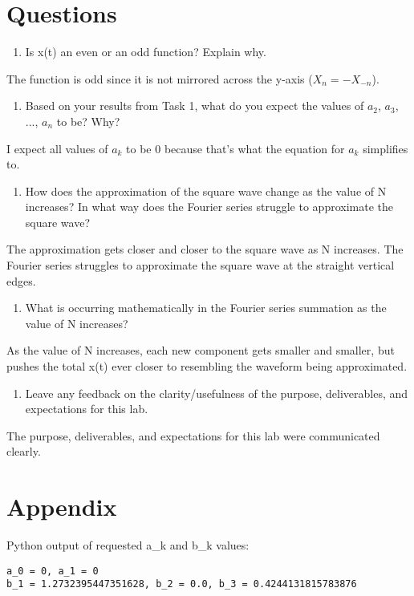 \documentclass[12pt]{article}
\begin{document}
\newpage
\section*{Questions}

\begin{enumerate}
    \item Is x(t) an even or an odd function? Explain why.
\end{enumerate}
    \par The function is odd since it is not mirrored across the y-axis ($X_n = -X_{-n}$).
    
\begin{enumerate}[resume]
    \item Based on your results from Task 1, what do you expect the values of $a_2$, $a_3$, ..., $a_n$ to be? Why?
\end{enumerate}
    \par I expect all values of $a_k$ to be 0 because that's what the equation for $a_k$ simplifies to.
    
\begin{enumerate}[resume]
    \item How does the approximation of the square wave change as the value of N increases? In what way does the Fourier series struggle to approximate the square wave?
\end{enumerate}
    \par The approximation gets closer and closer to the square wave as N increases. The Fourier series struggles to approximate the square wave at the straight vertical edges.
    
\begin{enumerate}[resume]
    \item What is occurring mathematically in the Fourier series summation as the value of N increases?
\end{enumerate}
    \par As the value of N increases, each new component gets smaller and smaller, but pushes the total x(t) ever closer to resembling the waveform being approximated.
    
\begin{enumerate}[resume]
    \item Leave any feedback on the clarity/usefulness of the purpose, deliverables, and expectations for this lab.
\end{enumerate}
    \par The purpose, deliverables, and expectations for this lab were communicated clearly.

\newpage
\section*{Appendix}

Python output of requested a\_k and b\_k values:
\begin{verbatim}
a_0 = 0, a_1 = 0
b_1 = 1.2732395447351628, b_2 = 0.0, b_3 = 0.4244131815783876
\end{verbatim}
\end{document}
